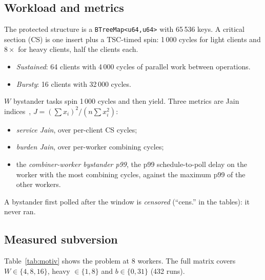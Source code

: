 \documentclass[10pt,twocolumn]{article}
\newcommand{\lk}[1]{\texttt{#1}}
\begin{document}
\subsection{Workload and metrics}
The protected structure is a \lk{BTreeMap<u64,u64>} with 65\,536 keys. A
critical section (CS) is one insert plus a TSC-timed spin: 1\,000 cycles for
light clients and $8\times$ for heavy clients, half the clients each.
\begin{itemize}
\item \emph{Sustained}: 64 clients with 4\,000 cycles of parallel work between
  operations.
\item \emph{Bursty}: 16 clients with 32\,000 cycles.
\end{itemize}
$W$ bystander tasks spin 1\,000 cycles and then yield. Three metrics are Jain
indices~\cite{jain}, $J=(\sum x_i)^2/(n\sum x_i^2)$:
\begin{itemize}
\item \emph{service Jain}, over per-client CS cycles;
\item \emph{burden Jain}, over per-worker combining cycles;
\item the \emph{combiner-worker bystander p99}, the p99 schedule-to-poll delay
  on the worker with the most combining cycles, against the maximum p99 of the
  other workers.
\end{itemize}
A bystander first polled after the window is \emph{censored} (``cens.'' in the
tables): it never ran.

\begin{table}[t]
\centering\footnotesize
{}
\caption{The problem, phase-2 matrix, $W{=}8$, heavy $8\times$ (09-28 window).
  Service $J$ is over clients and burden $J$ over workers. The p99 columns are
  bystander schedule-to-poll delays in $\mu$s on the combiner worker and the
  maximum over the other workers. The last column counts starved clients and
  bystanders (0 ops in 2\,s). \lk{fc-noyield} is FC without the cooperative
  yield of \S\ref{sec:design}.}
\label{tab:motiv}
\end{table}

\subsection{Measured subversion}
Table~\ref{tab:motiv} shows the problem at 8 workers. The full matrix covers
$W\in\{4,8,16\}$, heavy $\in\{1,8\}$ and $b\in\{0,31\}$ (432 runs).
\end{document}
